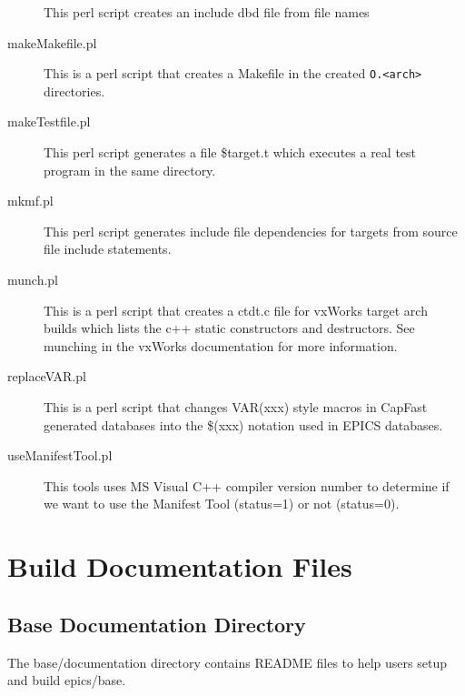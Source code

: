\begin{description}
This perl script creates an include dbd file from file names

\item[makeMakefile.pl]

This is a perl script that creates a Makefile in the created \verb|O.<arch>| directories.

\item[makeTestfile.pl]

This perl script generates a file \$target.t which executes a real test program in the same directory.

\item[mkmf.pl]

This perl script generates include file dependencies for targets from source file include statements.

\item[munch.pl]

This is a perl script that creates a ctdt.c file for vxWorks target arch builds which lists the c++ static constructors 
and destructors. See munching in the vxWorks documentation for more information.

\item[replaceVAR.pl]

This is a perl script that changes VAR(xxx) style macros in CapFast generated databases into the \$(xxx) notation 
used in EPICS databases.

\item[useManifestTool.pl]

This tools uses MS Visual C++ compiler version number to determine if we want to use the Manifest Tool 
(status=1) or not (status=0).

\end{description}

\section{Build Documentation Files}

\subsection{Base Documentation Directory}

The base/documentation directory contains README files to help users setup and build epics/base.


